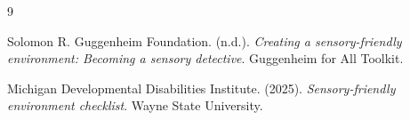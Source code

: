 \documentclass[11pt]{article}
\begin{document}
\newpage
\small
\begin{thebibliography}{9}

Solomon R. Guggenheim Foundation. (n.d.). \textit{Creating a sensory-friendly environment: Becoming a sensory detective}. Guggenheim for All Toolkit.

Michigan Developmental Disabilities Institute. (2025). \textit{Sensory-friendly environment checklist}. Wayne State University.

\end{thebibliography}
\end{document}
